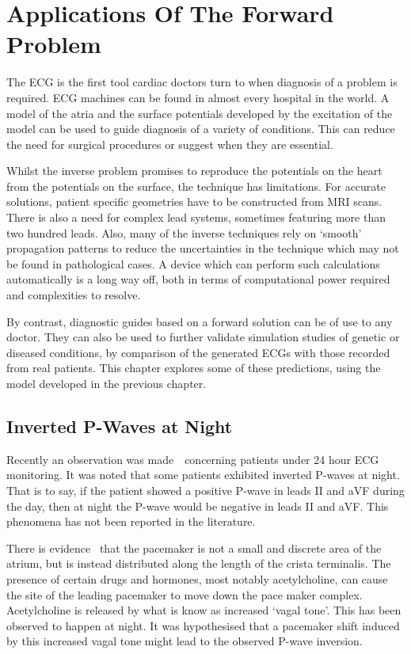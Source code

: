 \chapter{Applications Of The Forward Problem}

The ECG is the first tool cardiac doctors turn to when diagnosis of a problem is
required.
ECG machines can be found in almost every hospital in the world.
A model of the atria and the surface potentials developed by the excitation of
the model can be used to guide diagnosis of a variety of conditions.
This can reduce the need for surgical procedures or suggest when they are
essential.

Whilst the inverse problem promises to reproduce the potentials on the heart
from the potentials on the surface, the technique has limitations.
For accurate solutions, patient specific geometries have to be constructed from
MRI scans.
There is also a need for complex lead systems, sometimes featuring more than two
hundred leads.
Also, many of the inverse techniques rely on `smooth' propagation patterns to
reduce the uncertainties in the technique which may not be found in pathological
cases.
A device which can perform such calculations automatically is a long way off,
both in terms of computational power required and complexities to resolve.

By contrast, diagnostic guides based on a forward solution can be of use to any
doctor.
They can also be used to further validate simulation studies of genetic or
diseased conditions, by comparison of the generated ECGs with those recorded
from real patients.
This chapter explores some of these predictions, using the model developed in
the previous chapter.

\section{Inverted P-Waves at Night}

Recently an observation was made~\cite{BoyettPrivate}\ concerning patients under
24 hour ECG monitoring.
It was noted that some patients exhibited inverted P-waves at night.
That is to say, if the patient showed a positive P-wave in leads II and aVF
during the day, then at night the P-wave would be negative in leads II and aVF.
This phenomena has not been reported in the literature.

There is evidence~\cite{Shibata2001,Boineau1988} that the pacemaker is not a
small and discrete area of the atrium, but is instead distributed along the
length of the crista terminalis.
The presence of certain drugs and hormones, most notably acetylcholine, can cause
the site of the leading pacemaker to move down the pace maker complex.
Acetylcholine is released by what is know as increased `vagal tone'.
This has been observed to happen at night.
It was hypothesised that a pacemaker shift induced by this increased vagal tone
might lead to the observed P-wave inversion.

